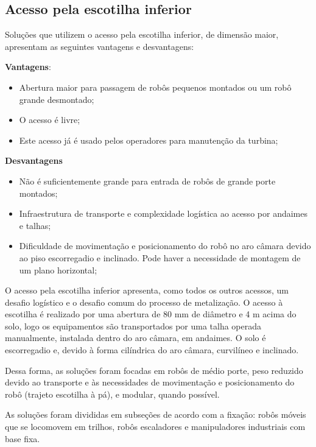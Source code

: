 \subsection{Acesso pela escotilha inferior}
Soluções que utilizem o acesso pela escotilha inferior, de dimensão maior,
apresentam as seguintes vantagens e desvantagens:

\textbf{Vantagens}:
\begin{itemize}
  \item Abertura maior para passagem de robôs pequenos montados ou um robô
  grande desmontado;
  \item O acesso é livre;
  \item Este acesso já é usado pelos operadores para manutenção da turbina;
\end{itemize}

\textbf{Desvantagens}
\begin{itemize}
  \item Não é suficientemente grande para entrada de robôs de grande
  porte montados;
  \item Infraestrutura de transporte e complexidade logística ao acesso por
  andaimes e talhas;
  \item Dificuldade de movimentação e posicionamento do robô no aro câmara
  devido ao piso escorregadio e inclinado. Pode haver a necessidade de montagem
  de um plano horizontal; 
\end{itemize}

O acesso pela escotilha inferior apresenta, como todos os outros
acessos, um desafio logístico e o desafio comum do processo de metalização. O
acesso à escotilha é realizado por uma abertura de 80 mm de diâmetro e 4 m acima
do solo, logo os equipamentos são transportados por uma talha operada manualmente,
instalada dentro do aro câmara, em andaimes. O solo é escorregadio e, devido à
forma cilíndrica do aro câmara, curvilíneo e inclinado.

Dessa forma, as soluções foram focadas em robôs de médio porte, peso reduzido
devido ao transporte e às necessidades de movimentação e posicionamento do robô
(trajeto escotilha à pá), e modular, quando possível.

As soluções foram divididas em subseções de acordo com a fixação:
robôs móveis que se locomovem em trilhos, robôs escaladores e manipuladores
industriais com base fixa. 




 
%